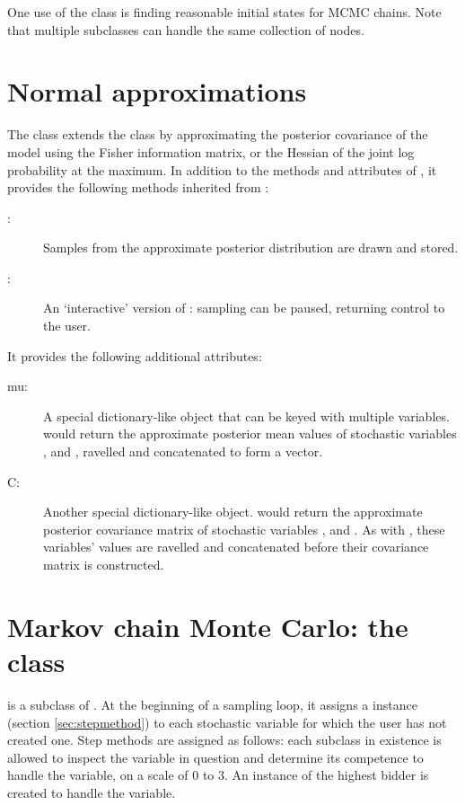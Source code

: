 One use of the  class is finding reasonable initial states for MCMC chains. Note that multiple  subclasses can handle the same collection of nodes.

\hypertarget{norm-approx}{}
\section*{Normal approximations} \label{sec:norm-approx}

The  class extends the  class by approximating the posterior covariance of the model using the Fisher information matrix, or the Hessian of the joint log probability at the maximum. In addition to the methods and attributes of , it provides the following methods inherited from :
\begin{description}
    \item[:] Samples from the approximate posterior distribution are drawn and stored.
    \item[:] An `interactive' version of : sampling can be paused, returning control to the user.
\end{description}
It provides the following additional attributes:
\begin{description}
    \item[mu:] A special dictionary-like object that can be keyed with multiple variables.  would return the approximate posterior mean values of stochastic variables ,  and , ravelled and concatenated to form a vector.
    \item[C:] Another special dictionary-like object.  would return the approximate posterior covariance matrix of stochastic variables ,  and . As with , these variables' values are ravelled and concatenated before their covariance matrix is constructed.
\end{description}

\hypertarget{mcmc}{}
\section*{Markov chain Monte Carlo: the  class} \label{sec:mcmc}
  is a subclass of . At the beginning of a sampling loop, it assigns a  instance (section \ref{sec:stepmethod}) to each stochastic variable for which the user has not created one. Step methods are assigned as follows: each  subclass in existence is allowed to inspect the variable in question and determine its competence to handle the variable, on a scale of 0 to 3. An instance of the highest bidder is created to handle the variable.

